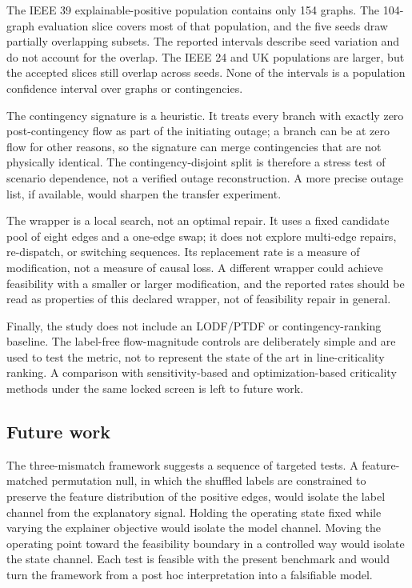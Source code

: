 The IEEE 39 explainable-positive population contains only 154 graphs. The 104-graph evaluation slice covers most of that population, and the five seeds draw partially overlapping subsets. The reported intervals describe seed variation and do not account for the overlap. The IEEE 24 and UK populations are larger, but the accepted slices still overlap across seeds. None of the intervals is a population confidence interval over graphs or contingencies.

The contingency signature is a heuristic. It treats every branch with exactly zero post-contingency flow as part of the initiating outage; a branch can be at zero flow for other reasons, so the signature can merge contingencies that are not physically identical. The contingency-disjoint split is therefore a stress test of scenario dependence, not a verified outage reconstruction. A more precise outage list, if available, would sharpen the transfer experiment.

The wrapper is a local search, not an optimal repair. It uses a fixed candidate pool of eight edges and a one-edge swap; it does not explore multi-edge repairs, re-dispatch, or switching sequences. Its replacement rate is a measure of modification, not a measure of causal loss. A different wrapper could achieve feasibility with a smaller or larger modification, and the reported rates should be read as properties of this declared wrapper, not of feasibility repair in general.

Finally, the study does not include an LODF/PTDF or contingency-ranking baseline. The label-free flow-magnitude controls are deliberately simple and are used to test the metric, not to represent the state of the art in line-criticality ranking. A comparison with sensitivity-based and optimization-based criticality methods under the same locked screen is left to future work.

\subsection{Future work}\label{future_work}

The three-mismatch framework suggests a sequence of targeted tests. A feature-matched permutation null, in which the shuffled labels are constrained to preserve the feature distribution of the positive edges, would isolate the label channel from the explanatory signal. Holding the operating state fixed while varying the explainer objective would isolate the model channel. Moving the operating point toward the feasibility boundary in a controlled way would isolate the state channel. Each test is feasible with the present benchmark and would turn the framework from a post hoc interpretation into a falsifiable model.

